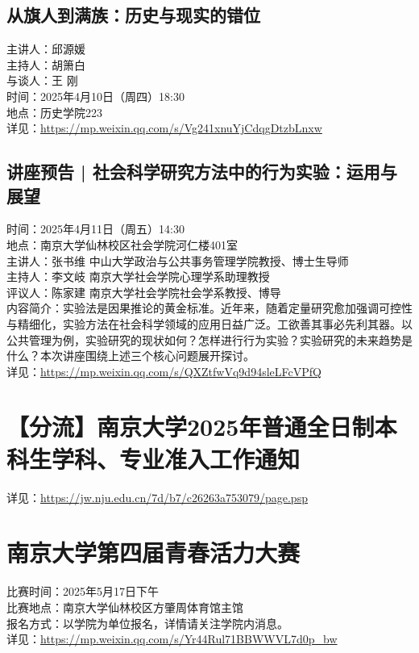 \documentclass[letterpaper, 12pt]{article}
\begin{document}
\begin{multicols}{2}
\subsection{从旗人到满族：历史与现实的错位}
主讲人：邱源媛
\\主持人：胡箫白
\\与谈人：王   刚
\\时间：2025年4月10日（周四）18:30
\\地点：历史学院223
\\详见：\url{https://mp.weixin.qq.com/s/Vg241xnuYjCdqgDtzbLnxw}

\subsection{讲座预告 | 社会科学研究方法中的行为实验：运用与展望}
时间：2025年4月11日（周五）14:30
\\地点：南京大学仙林校区社会学院河仁楼401室
\\主讲人：张书维 中山大学政治与公共事务管理学院教授、博士生导师
\\主持人：李文岐 南京大学社会学院心理学系助理教授
\\评议人：陈家建 南京大学社会学院社会学系教授、博导
\\内容简介：实验法是因果推论的黄金标准。近年来，随着定量研究愈加强调可控性与精细化，实验方法在社会科学领域的应用日益广泛。工欲善其事必先利其器。以公共管理为例，实验研究的现状如何？怎样进行行为实验？实验研究的未来趋势是什么？本次讲座围绕上述三个核心问题展开探讨。
\\详见：\url{https://mp.weixin.qq.com/s/QXZtfwVq9d94sleLFcVPfQ}



\section{【分流】南京大学2025年普通全日制本科生学科、专业准入工作通知}
详见：\url{https://jw.nju.edu.cn/7d/b7/c26263a753079/page.psp}


\section{南京大学第四届青春活力大赛}
比赛时间：2025年5月17日下午
\\比赛地点：南京大学仙林校区方肇周体育馆主馆
\\报名方式：以学院为单位报名，详情请关注学院内消息。
\\详见：\url{https://mp.weixin.qq.com/s/Yr44Rul71BBWWVL7d0p_bw}


\end{multicols}
\end{document}
